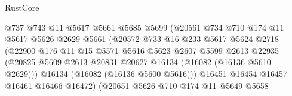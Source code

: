 \begin{lexlean}{RustCore}
\begin{coremodule}
                                    @737
                                    @743
                                    @11
                                    @5617
                                    @5661
                                    @5685
                                    @5699
                                    (@20561
                                      @734
                                      @710
                                      @174
                                      @11
                                      @5617
                                      @5626
                                      @2629
                                      @5661
                                      (@20572
                                        @733
                                        @16
                                        @233
                                        @5617
                                        @5624
                                        @2718
                                        (@22900
                                          @176
                                          @11
                                          @15
                                          @5571
                                          @5616
                                          @5623
                                          @2607
                                          @5599
                                          @2613
                                          @22935
                                          (@20825
                                            @5609
                                            @2613
                                            @20831
                                            @20627
                                            @16134
                                            (@16082 (@16136 @5610 @2629)))
                                          @16134
                                          (@16082 (@16136 @5600 @5616)))
                                        @16451
                                        @16454
                                        @16457
                                        @16461
                                        @16466
                                        @16472)
                                      (@20651
                                        @5626
                                        @710
                                        @174
                                        @11
                                        @5649
                                        @5658

\end{coremodule}
\end{lexlean}
